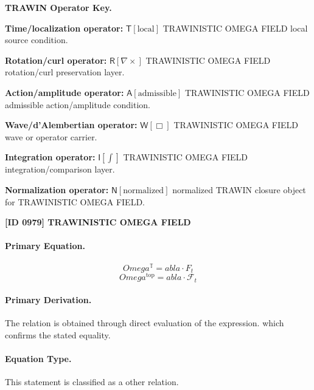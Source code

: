 \par\vspace{0.45\baselineskip}
\noindent\begin{minipage}[t]{\linewidth}
\begingroup
\small
\raggedright
\textbf{TRAWIN Operator Key.}\par
\noindent\textbf{Time/localization operator:} $\mathsf{T}\!\left[\mathrm{local}\right]$ TRAWINISTIC OMEGA FIELD local source condition.\par
\noindent\textbf{Rotation/curl operator:} $\mathsf{R}\!\left[\nabla\times\right]$ TRAWINISTIC OMEGA FIELD rotation/curl preservation layer.\par
\noindent\textbf{Action/amplitude operator:} $\mathsf{A}\!\left[\mathrm{admissible}\right]$ TRAWINISTIC OMEGA FIELD admissible action/amplitude condition.\par
\noindent\textbf{Wave/d'Alembertian operator:} $\mathsf{W}\!\left[\Box\right]$ TRAWINISTIC OMEGA FIELD wave or operator carrier.\par
\noindent\textbf{Integration operator:} $\mathsf{I}\!\left[\int\right]$ TRAWINISTIC OMEGA FIELD integration/comparison layer.\par
\noindent\textbf{Normalization operator:} $\mathsf{N}\!\left[\mathrm{normalized}\right]$ normalized TRAWIN closure object for TRAWINISTIC OMEGA FIELD.\par
\endgroup
\end{minipage}

\clearpage
\noindent\textbf{[ID 0979] TRAWINISTIC OMEGA FIELD}\par
\vspace{0.35em}
\paragraph{Primary Equation.}
\[
Omega^{\mathbb{T}}= abla\cdot F_{t}
\]
\[
Omega^{\mathrm{top}}= abla\cdot\mathcal{F}_{t}
\]

\paragraph{Primary Derivation.}
The relation is obtained through direct evaluation of the expression. which confirms the stated equality.
\paragraph{Equation Type.}
This statement is classified as a other relation.

